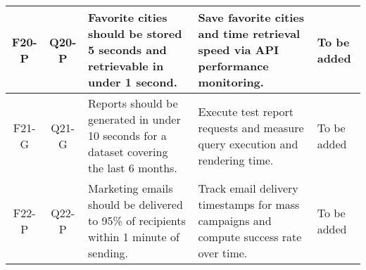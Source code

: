 \begin{longtable}{|c|c|p{4.5cm}|p{3.5cm}|p{3.5cm}|}
    \hline
    F20-P & Q20-P & Favorite cities should be stored 5 seconds and retrievable in under 1 second. & Save favorite cities and time retrieval speed via API performance monitoring. & To be added \\
    \hline
    F21-G & Q21-G & Reports should be generated in under 10 seconds for a dataset covering the last 6 months. & Execute test report requests and measure query execution and rendering time. & To be added \\
    \hline
    F22-P & Q22-P & Marketing emails should be delivered to 95\% of recipients within 1 minute of sending. & Track email delivery timestamps for mass campaigns and compute success rate over time. & To be added \\
    \hline

\end{longtable}

